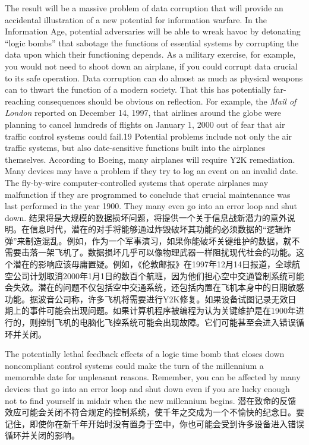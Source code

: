 \begin{Parallel}{97mm}{45mm}
  \ParallelPar


  \ParallelLText
  {The result will be a massive problem of data corruption that will provide an accidental illustration of a new potential for information warfare. In the Information Age, potential adversaries will be able to wreak havoc by detonating “logic bombs” that sabotage the functions of essential systems by corrupting the data upon which their functioning depends. As a military exercise, for example, you would not need to shoot down an airplane, if you could corrupt data crucial to its safe operation. Data corruption can do almost as much as physical weapons can to thwart the function of a modern society. That this has potentially far-reaching consequences should be obvious on reflection. For example, the \emph{Mail of London} reported on December 14, 1997, that airlines around the globe were planning to cancel hundreds of flights on January 1, 2000 out of fear that air traffic control systems could fail.19 Potential problems include not only the air traffic systems, but also date-sensitive functions built into the airplanes themselves. According to Boeing, many airplanes will require Y2K remediation. Many devices may have a problem if they try to log an event on an invalid date. The fly-by-wire computer-controlled systems that operate airplanes may malfunction if they are programmed to conclude that crucial maintenance was last performed in the year 1900. They many even go into an error loop and shut down. }  
  \ParallelRText
  {\small 结果将是大规模的数据损坏问题，将提供一个关于信息战新潜力的意外说明。在信息时代，潜在的对手将能够通过炸毁破坏其功能的必须数据的“逻辑炸弹”来制造混乱。例如，作为一个军事演习，如果你能破坏关键维护的数据，就不需要击落一架飞机了。数据损坏几乎可以像物理武器一样阻扰现代社会的功能。这个潜在的影响应该毋庸置疑。例如，《伦敦邮报》在1997年12月14日报道，全球航空公司计划取消2000年1月1日的数百个航班，因为他们担心空中交通管制系统可能会失效。潜在的问题不仅包括空中交通系统，还包括内置在飞机本身中的日期敏感功能。据波音公司称，许多飞机将需要进行Y2K修复。如果设备试图记录无效日期上的事件可能会出现问题。如果计算机程序被编程为认为关键维护是在1900年进行的，则控制飞机的电脑化飞控系统可能会出现故障。它们可能甚至会进入错误循环并关闭。}
  \ParallelPar


  \ParallelLText
  {The potentially lethal feedback effects of a logic time bomb that closes down noncompliant control systems could make the turn of the millennium a memorable date for unpleasant reasons. Remember, you can be affected by many devices that go into an error loop and shut down even if you are lucky enough not to find yourself in midair when the new millennium begins.  }  
  \ParallelRText
  {\small 潜在致命的反馈效应可能会关闭不符合规定的控制系统，使千年之交成为一个不愉快的纪念日。要记住，即使你在新千年开始时没有置身于空中，你也可能会受到许多设备进入错误循环并关闭的影响。}
  \ParallelPar



\end{Parallel}
